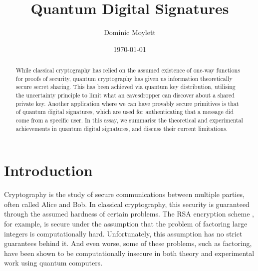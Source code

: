 \documentclass[%
 reprint,
 amsmath,amssymb,
 aps,
 pra,
]{revtex4-1}
\begin{document}
\title{Quantum Digital Signatures}

\author{Dominic Moylett}
%

\date{\today}%

\begin{abstract}
While classical cryptography has relied on the assumed existence of one-way functions for proofs of security, quantum cryptography has given us information theoretically secure secret sharing. This has been achieved via quantum key distribution, utilising the uncertainty principle to limit what an eavesdropper can discover about a shared private key. Another application where we can have provably secure primitives is that of quantum digital signatures, which are used for authenticating that a message did come from a specific user. In this essay, we summarise the theoretical and experimental achievements in quantum digital signatures, and discuss their current limitations.
\end{abstract}

\maketitle


\section{Introduction}

Cryptography is the study of secure communications between multiple parties, often called Alice and Bob. In classical cryptography, this security is guaranteed through the assumed hardness of certain problems. The RSA encryption scheme \cite{Rivest:1978:MOD:359340.359342}, for example, is secure under the assumption that the problem of factoring large integers is computationally hard. Unfortunately, this assumption has no strict guarantees behind it. And even worse, some of these problems, such as factoring, have been shown to be computationally insecure in both theory \cite{Shor97} and experimental work \cite{MLL+12, 1604.05796} using quantum computers.
\end{document}
